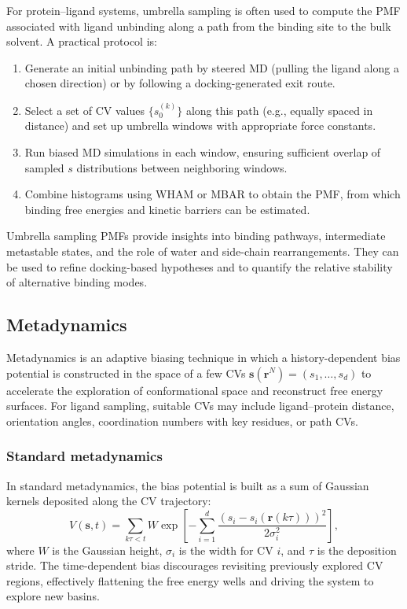 \documentclass[12pt,a4paper]{article}
\begin{document}
For protein--ligand systems, umbrella sampling is often used to compute the PMF associated with ligand unbinding along a path from the binding site to the bulk solvent.\cite{TorrieValleau1977,Roux1995,Kastner2011} A practical protocol is:

\begin{enumerate}
\item Generate an initial unbinding path by steered MD (pulling the ligand along a chosen direction) or by following a docking-generated exit route.
\item Select a set of CV values \(\{s_0^{(k)}\}\) along this path (e.g., equally spaced in distance) and set up umbrella windows with appropriate force constants.
\item Run biased MD simulations in each window, ensuring sufficient overlap of sampled \(s\) distributions between neighboring windows.
\item Combine histograms using WHAM or MBAR to obtain the PMF, from which binding free energies and kinetic barriers can be estimated.
\end{enumerate}

Umbrella sampling PMFs provide insights into binding pathways, intermediate metastable states, and the role of water and side-chain rearrangements. They can be used to refine docking-based hypotheses and to quantify the relative stability of alternative binding modes.

\subsection{Metadynamics}

Metadynamics is an adaptive biasing technique in which a history-dependent bias potential is constructed in the space of a few CVs \(\mathbf{s}(\mathbf{r}^N) = (s_1,\dots,s_d)\) to accelerate the exploration of conformational space and reconstruct free energy surfaces.\cite{LaioParrinello2002,Barducci2008} For ligand sampling, suitable CVs may include ligand--protein distance, orientation angles, coordination numbers with key residues, or path CVs.

\subsubsection{Standard metadynamics}

In standard metadynamics, the bias potential is built as a sum of Gaussian kernels deposited along the CV trajectory:
\[
V(\mathbf{s}, t) = \sum_{k\tau < t} W \exp\left[-\sum_{i=1}^{d} \frac{\left(s_i - s_i(\mathbf{r}(k\tau))\right)^2}{2\sigma_i^2}\right],
\]
where \(W\) is the Gaussian height, \(\sigma_i\) is the width for CV \(i\), and \(\tau\) is the deposition stride.\cite{LaioParrinello2002} The time-dependent bias discourages revisiting previously explored CV regions, effectively flattening the free energy wells and driving the system to explore new basins.
\end{document}
